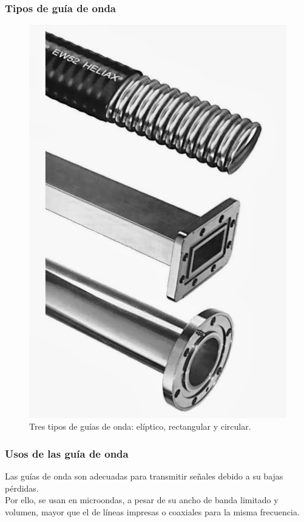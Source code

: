 \documentclass[12pt]{beamer}
\begin{document}
\begin{frame}
\frametitle{Tipos de guía de onda}
\begin{figure}[H]
    \centering
    \includegraphics[scale=0.15]{Imagenes/Tubos_Guias_Onda.jpg}
    \caption{Tres tipos de guías de onda: elíptico, rectangular y circular.}
    \label{fig:figura_01}
\end{figure}
\end{frame}
\begin{frame}
\frametitle{Usos de las guía de onda}
Las guías de onda son adecuadas para transmitir señales debido a su bajas pérdidas.
\\
\bigskip
\pause
Por ello, se usan en microondas, a pesar de su ancho de banda limitado y volumen, mayor que el de líneas impresas o coaxiales para la misma frecuencia.
\end{frame}
\end{document}
